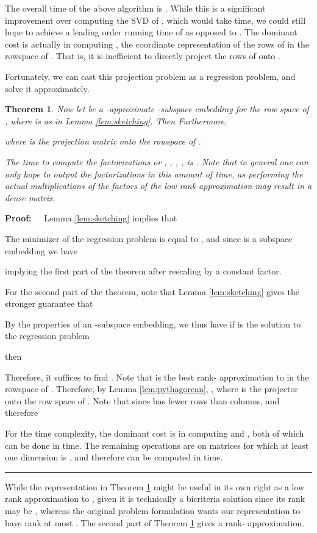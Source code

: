 \documentclass[11pt]{article}
\newtheorem{theorem}{Theorem}
\newenvironment{proof}{\begin{trivlist} \item {\bf Proof:~~}}
  {\qed\end{trivlist}}
\def\qed{\hfill\rule{2mm}{2mm}}
\begin{document}
The overall time of the above algorithm is . While this is a significant
improvement over computing the SVD of , which would take  time, we could still
hope to achieve a leading order running time of  as opposed to . The dominant
cost is actually in computing , 
the coordinate representation of the rows of  in the rowspace of . That
is, it is inefficient to directly project the rows of  onto . 

Fortunately, we can cast this projection problem as a regression problem, and solve it approximately. 
\begin{theorem}\label{thm:lowrank}
Now let  be a -approximate -subspace embedding for the row space of , where 
is as in Lemma \ref{lem:sketching}. Then  Furthermore, 
 
where  is the projection
matrix onto the rowspace of . 

The time to compute the factorizations 
 or 
, , , 
,
is . Note that in general one can only hope to output
the factorizations in this amount of time, as performing the actual multiplications of the 
factors of the low rank approximation may result in a dense
 matrix. 
\end{theorem}
\begin{proof}
Lemma \ref{lem:sketching} implies that 

The minimizer
of the regression problem  
is equal to , and since  is a subspace
embedding we have 

implying the first part of the theorem after rescaling  by a constant factor. 

For the second part of the theorem, note that Lemma \ref{lem:sketching} gives the stronger guarantee that

By the properties of an -subspace embedding, we thus have if  is the solution to the regression
problem

then 

Therefore, it suffices to find . Note that  is the best rank- approximation to  in the rowspace
of . Therefore, by Lemma \ref{lem:pythagorean}, , where  is the projector onto
the row space of . Note that  since  has fewer rows than columns, and therefore
 
For the time complexity, the dominant cost is in computing  and , 
both of which can be done in  time. 
The remaining operations are on matrices for which at least one dimension is , and therefore can be computed
in  time. 
\end{proof}
While the representation  in Theorem \ref{thm:lowrank} 
might be useful in its own right as a low rank approximation to , given
it is technically a bicriteria solution since its rank may be ,
whereas the original problem formulation wants our representation to have rank at most . 
The second part of Theorem \ref{thm:lowrank}
gives a rank- approximation. 
\end{document}

